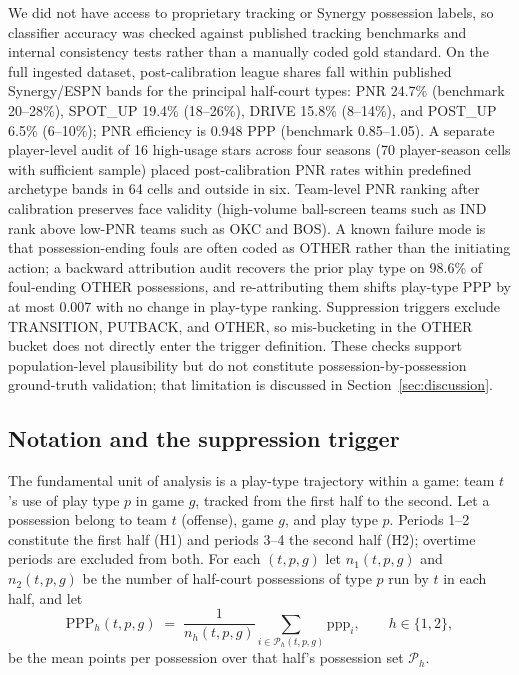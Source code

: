 \documentclass[11pt]{article}
\begin{document}
We did not have access to proprietary tracking or Synergy possession labels, so classifier accuracy was checked against published tracking benchmarks and internal consistency tests rather than a manually coded gold standard. On the full ingested dataset, post-calibration league shares fall within published Synergy/ESPN bands for the principal half-court types: PNR 24.7\% (benchmark 20--28\%), SPOT\_UP 19.4\% (18--26\%), DRIVE 15.8\% (8--14\%), and POST\_UP 6.5\% (6--10\%); PNR efficiency is 0.948 PPP (benchmark 0.85--1.05). A separate player-level audit of 16 high-usage stars across four seasons (70 player-season cells with sufficient sample) placed post-calibration PNR rates within predefined archetype bands in 64 cells and outside in six. Team-level PNR ranking after calibration preserves face validity (high-volume ball-screen teams such as IND rank above low-PNR teams such as OKC and BOS). A known failure mode is that possession-ending fouls are often coded as OTHER rather than the initiating action; a backward attribution audit recovers the prior play type on 98.6\% of foul-ending OTHER possessions, and re-attributing them shifts play-type PPP by at most 0.007 with no change in play-type ranking. Suppression triggers exclude TRANSITION, PUTBACK, and OTHER, so mis-bucketing in the OTHER bucket does not directly enter the trigger definition. These checks support population-level plausibility but do not constitute possession-by-possession ground-truth validation; that limitation is discussed in Section~\ref{sec:discussion}.

\subsection{Notation and the suppression trigger}

The fundamental unit of analysis is a play-type trajectory within a game: team $t$'s use of play type $p$ in game $g$, tracked from the first half to the second. Let a possession belong to team $t$ (offense), game $g$, and play type $p$.
Periods 1--2 constitute the first half (H1) and periods 3--4 the second half
(H2); overtime periods are excluded from both. For each $(t,p,g)$ let
$n_1(t,p,g)$ and $n_2(t,p,g)$ be the number of half-court possessions of type
$p$ run by $t$ in each half, and let
%
\begin{equation}
\mathrm{PPP}_h(t,p,g) \;=\; \frac{1}{n_h(t,p,g)}
  \sum_{i \in \mathcal{P}_h(t,p,g)} \mathrm{ppp}_i,
  \qquad h \in \{1,2\},
\end{equation}
%
be the mean points per possession over that half's possession set
$\mathcal{P}_h$.
\end{document}
